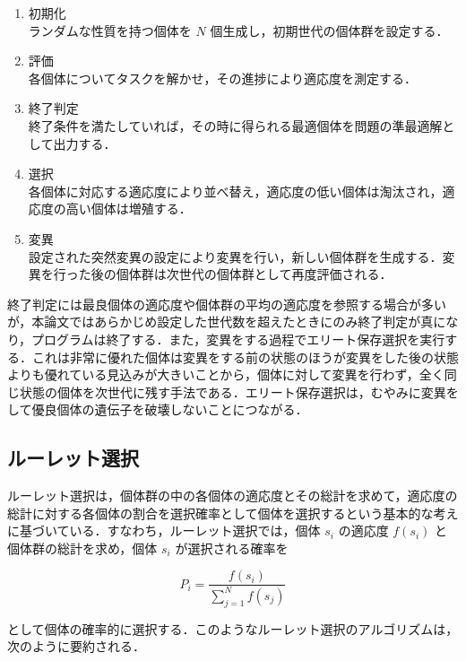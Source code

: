 \begin{enumerate}
    \item 初期化 \\
    ランダムな性質を持つ個体を $ N $ 個生成し，初期世代の個体群を設定する．

    \item 評価 \\
    各個体についてタスクを解かせ，その進捗により適応度を測定する．

    \item 終了判定 \\
    終了条件を満たしていれば，その時に得られる最適個体を問題の準最適解として出力する．

    \item 選択 \\
    各個体に対応する適応度により並べ替え，適応度の低い個体は淘汰され，適応度の高い個体は増殖する．

    \item 変異 \\
    設定された突然変異の設定により変異を行い，新しい個体群を生成する．変異を行った後の個体群は次世代の個体群として再度評価される．
\end{enumerate}

終了判定には最良個体の適応度や個体群の平均の適応度を参照する場合が多いが，本論文ではあらかじめ設定した世代数を超えたときにのみ終了判定が真になり，プログラムは終了する．また，変異をする過程でエリート保存選択を実行する．これは非常に優れた個体は変異をする前の状態のほうが変異をした後の状態よりも優れている見込みが大きいことから，個体に対して変異を行わず，全く同じ状態の個体を次世代に残す手法である．エリート保存選択は，むやみに変異をして優良個体の遺伝子を破壊しないことにつながる．

\subsection{ルーレット選択}
ルーレット選択は，個体群の中の各個体の適応度とその総計を求めて，適応度の総計に対する各個体の割合を選択確率として個体を選択するという基本的な考えに基づいている\cite{遺伝的アルゴリズム}．すなわち，ルーレット選択では，個体 $ s_i $ の適応度 $ f(s_i) $ と個体群の総計を求め，個体 $ s_i $ が選択される確率を

\begin{equation}
    P_i = \frac{f(s_i)}{\sum^N_{j=1} f(s_j)}
\end{equation}

として個体の確率的に選択する．このようなルーレット選択のアルゴリズムは，次のように要約される．

